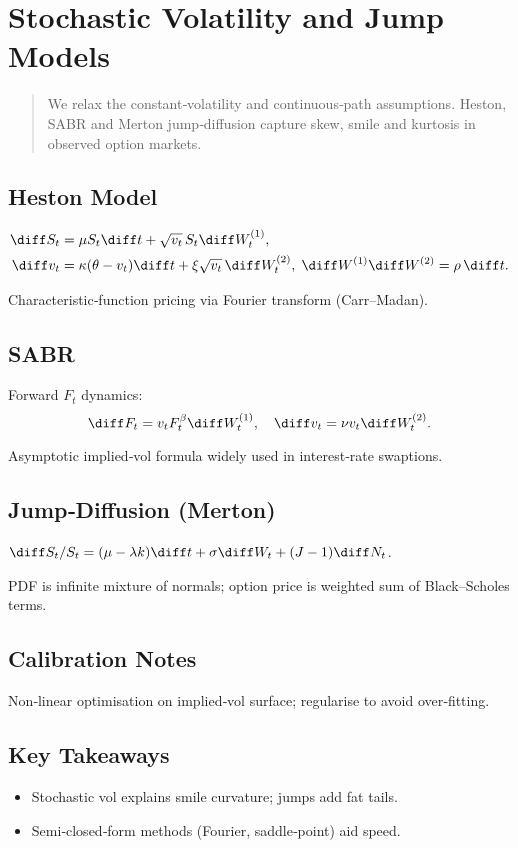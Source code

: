 \chapter{Stochastic Volatility and Jump Models}\label{ch:stochvol}

\begin{abstract}
We relax the constant‑volatility and continuous‑path assumptions.
Heston, SABR and Merton jump‑diffusion capture skew, smile and kurtosis
in observed option markets.
\end{abstract}

\section{Heston Model}

\[
\begin{aligned}
\diff S_t &= \mu S_t \diff t + \sqrt{v_t}\,S_t \diff W_t^{(1)}, \\
\diff v_t &= \kappa(\theta - v_t)\diff t + \xi\sqrt{v_t}\,\diff W_t^{(2)},\;
           \diff W^{(1)}\diff W^{(2)}=\rho\,\diff t.
\end{aligned}
\]

Characteristic‑function pricing via Fourier transform (Carr–Madan).

\section{SABR}

Forward \(F_t\) dynamics:
\[
\diff F_t = v_t F_t^\beta \diff W_t^{(1)},\quad
\diff v_t = \nu v_t \diff W_t^{(2)}.
\]

Asymptotic implied‑vol formula widely used in interest‑rate swaptions.

\section{Jump‑Diffusion (Merton)}

\(\diff S_t/S_t = (\mu-\lambda k)\diff t + \sigma \diff W_t
                  + (J-1)\diff N_t\).

PDF is infinite mixture of normals; option price is
weighted sum of Black--Scholes terms.

\section{Calibration Notes}

Non‑linear optimisation on implied‑vol surface; regularise to avoid over‑fitting.

\section*{Key Takeaways}
\begin{itemize}
  \item Stochastic vol explains smile curvature; jumps add fat tails.
  \item Semi‑closed‑form methods (Fourier, saddle‑point) aid speed.
\end{itemize}
